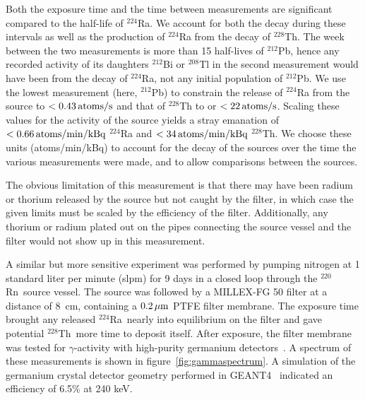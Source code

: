Both the exposure time and the time between measurements are significant compared to the half-life of $^{224}$Ra. We account for both the decay during these intervals as well as the production of $^{224}$Ra from the decay of $^{228}$Th. The week between the two measurements is more than 15 half-lives of $^{212}$Pb, hence any recorded activity of its daughters $^{212}$Bi or $^{208}$Tl in the second measurement would have been from the decay of $^{224}$Ra, not any initial population of $^{212}$Pb. We use the lowest measurement (here, $^{212}$Pb) to constrain the release of $^{224}$Ra from the source to $<0.43\,\mathrm{atoms/s}$ and that of $^{228}$Th to or $<22\,\mathrm{atoms/s}$. Scaling these values for the activity of the source yields a stray emanation of $<0.66\,\mathrm{atoms/min/kBq}$ $^{224}$Ra and $<34\,\mathrm{atoms/min/kBq}$ $^{228}$Th. We choose these units (atoms/min/kBq) to account for the decay of the sources over the time the various measurements were made, and to allow comparisons between the sources.

The obvious limitation of this measurement is that there may have been radium or thorium released by the source but not caught by the filter, in which case the given limits must be scaled by the efficiency of the filter. Additionally, any thorium or radium plated out on the pipes connecting the source vessel and the filter would not show up in this measurement.

A similar but more sensitive experiment was performed by pumping nitrogen at 1 standard liter per minute (slpm) for 9 days in a closed loop through the $^{220}$Rn~source vessel. The source was followed by a MILLEX-FG 50 filter at a distance of 8~cm, containing a $0.2\,\mathrm{\mu m}$ PTFE filter membrane. The exposure time brought any released $^{224}$Ra~nearly into equilibrium on the filter and gave potential $^{228}$Th~more time to deposit itself. After exposure, the filter membrane was tested for $\gamma$-activity with high-purity germanium detectors~\cite{Budjas:2007,Budjas:2009}. A spectrum of these measurements is shown in figure~\ref{fig:gammaspectrum}. A simulation of the germanium crystal detector geometry performed in GEANT4~\cite{Geant4} indicated an efficiency of 6.5\% at 240 keV.

